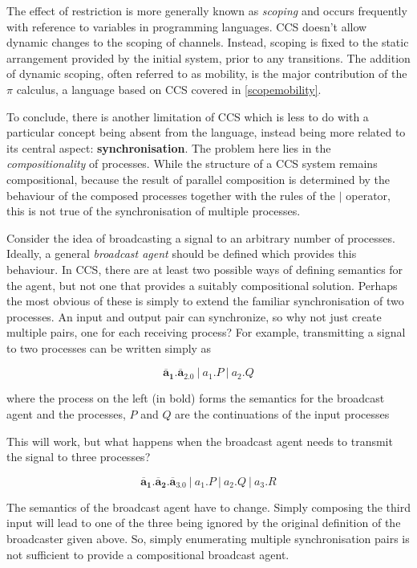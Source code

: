 The effect of restriction is more generally known as \emph{scoping}
and occurs frequently with reference to variables in programming
languages.  CCS doesn't allow dynamic changes to the scoping of
channels.  Instead, scoping is fixed to the static arrangement
provided by the initial system, prior to any transitions.  The
addition of dynamic scoping, often referred to as mobility, is the
major contribution of the $\pi$ calculus, a language based on CCS
covered in \ref{scopemobility}.

To conclude, there is another limitation of CCS which is less to do
with a particular concept being absent from the language, instead
being more related to its central aspect: \textbf{synchronisation}.
The problem here lies in the \emph{compositionality} of processes.
While the structure of a CCS system remains compositional, because the
result of parallel composition is determined by the behaviour of the
composed processes together with the rules of the $|$ operator, this
is not true of the synchronisation of multiple processes.

Consider the idea of broadcasting a signal to an arbitrary number of
processes.  Ideally, a general \emph{broadcast agent} should be
defined which provides this behaviour.  In CCS, there are at least two
possible ways of defining semantics for the agent, but not one that
provides a suitably compositional solution.  Perhaps the most obvious
of these is simply to extend the familiar synchronisation of two
processes.  An input and output pair can synchronize, so why not just
create multiple pairs, one for each receiving process?  For example,
transmitting a signal to two processes can be written simply as

\begin{equation}
\mathbf{\overline{a}_1.\overline{a}_2.0}\ |\ a_1.P\ |\ a_2.Q
\end{equation}

\noindent where the process on the left (in bold) forms the semantics
for the broadcast agent and the processes, $P$ and $Q$ are the
continuations of the input processes

This will work, but what happens when the broadcast agent needs to
transmit the signal to three processes?

\begin{equation}
\mathbf{\overline{a}_1.\overline{a}_2.\overline{a}_3.0}\ |\ a_1.P\ |\ a_2.Q\ |\ a_3.R
\end{equation}

\noindent The semantics of the broadcast agent have to change.  Simply
composing the third input will lead to one of the three being ignored
by the original definition of the broadcaster given above.  So, simply
enumerating multiple synchronisation pairs is not sufficient to
provide a compositional broadcast agent.

